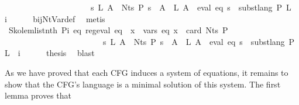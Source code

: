 \begin{isabellebody}
\ \ \ \ \ \ \ \ \ \ \ \ \ \ \ \ \ \ \ \ {\isasymand}\ {\isacharparenleft}{\kern0pt}{\isasymforall}s\ L{\isachardot}{\kern0pt}\ {\isacharparenleft}{\kern0pt}{\isasymforall}A\ {\isasymin}\ Nts\ P{\isachardot}{\kern0pt}\ s\ {\isacharparenleft}{\kern0pt}{\isasymgamma}{\isacharprime}{\kern0pt}\ A{\isacharparenright}{\kern0pt}\ {\isacharequal}{\kern0pt}\ L\ A{\isacharparenright}{\kern0pt}\ {\isasymlongrightarrow}\ eval\ eq\ s\ {\isacharequal}{\kern0pt}\ subst{\isacharunderscore}{\kern0pt}lang\ P\ L\ {\isacharparenleft}{\kern0pt}{\isasymgamma}\ i{\isacharparenright}{\kern0pt}{\isacharparenright}{\kern0pt}{\isachardoublequoteclose}\isanewline
\ \ \ \ \isamarkupfalse%
\ bij{\isacharunderscore}{\kern0pt}Nt{\isacharunderscore}{\kern0pt}Var{\isacharunderscore}{\kern0pt}def\ \isamarkupfalse%
\ metis\isanewline
\ \ \isamarkupfalse%
\ Skolem{\isacharunderscore}{\kern0pt}list{\isacharunderscore}{\kern0pt}nth{\isacharbrackleft}{\kern0pt}\ P{\isacharequal}{\kern0pt}{\isachardoublequoteopen}{\isasymlambda}i\ eq{\isachardot}{\kern0pt}\ reg{\isacharunderscore}{\kern0pt}eval\ eq\ {\isasymand}\ {\isacharparenleft}{\kern0pt}{\isasymforall}x\ {\isasymin}\ vars\ eq{\isachardot}{\kern0pt}\ x\ {\isacharless}{\kern0pt}\ card\ {\isacharparenleft}{\kern0pt}Nts\ P{\isacharparenright}{\kern0pt}{\isacharparenright}{\kern0pt}\isanewline
\ \ \ \ \ \ \ \ \ \ \ \ \ \ \ \ \ \ \ \ \ \ \ {\isasymand}\ {\isacharparenleft}{\kern0pt}{\isasymforall}s\ L{\isachardot}{\kern0pt}\ {\isacharparenleft}{\kern0pt}{\isasymforall}A\ {\isasymin}\ Nts\ P{\isachardot}{\kern0pt}\ s\ {\isacharparenleft}{\kern0pt}{\isasymgamma}{\isacharprime}{\kern0pt}\ A{\isacharparenright}{\kern0pt}\ {\isacharequal}{\kern0pt}\ L\ A{\isacharparenright}{\kern0pt}\ {\isasymlongrightarrow}\ eval\ eq\ s\ {\isacharequal}{\kern0pt}\ subst{\isacharunderscore}{\kern0pt}lang\ P\ L\ {\isacharparenleft}{\kern0pt}{\isasymgamma}\ i{\isacharparenright}{\kern0pt}{\isacharparenright}{\kern0pt}{\isachardoublequoteclose}{\isacharbrackright}{\kern0pt}\isanewline
\ \ \ \ \isamarkupfalse%
\ {\isacharquery}{\kern0pt}thesis\ \isamarkupfalse%
\ blast\isanewline
{}\isamarkupfalse%
%
\endisatagproof
{\isafoldproof}%
%
\isadelimproof
%
\endisadelimproof
%
\begin{isamarkuptext}%
As we have proved that each CFG induces a system of  equations, it remains to
show that the  CFG's language is a minimal solution of this system. The first lemma proves that

\end{isamarkuptext}
\end{isabellebody}
